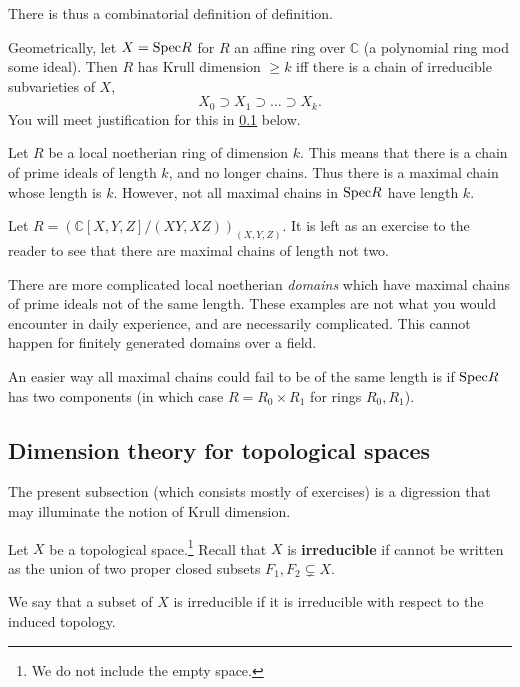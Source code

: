 There is thus a combinatorial definition of definition.

Geometrically, let $X = \mathrm{Spec} R$ for $R$ an affine ring over $\mathbb{C}$ (a
polynomial ring mod some ideal). Then $R$ has Krull dimension $\geq k$ iff there is a
chain of irreducible subvarieties of $X$,
\[ X_0 \supset X_1 \supset \dots \supset X_k . \]
You will meet justification for this in \ref{subsectiondimension} below.

\begin{remark} Let $R$ be a local noetherian ring of dimension $k$. This
means that there is a chain of prime ideals of length $k$, and no longer
chains. Thus there is a maximal chain whose length is $k$. However, not all
maximal chains in $\mathrm{Spec} R$ have length $k$. 
\end{remark} 

\begin{example} 
Let $R =( \mathbb{C}[X,Y,Z]/(XY,XZ))_{(X,Y,Z)}$. It is left as an
exercise to the reader to see that there are maximal chains of
length not two.

There are more complicated local noetherian \emph{domains} which have maximal
chains of prime ideals not of the same length. These examples are not what you
would encounter in daily experience, and are necessarily complicated. This
cannot happen for finitely generated domains over a field.
\end{example} 

\begin{example} 
An easier way all maximal chains could fail to be of the same length is if
$\mathrm{Spec} R$ has two components (in which case $R = R_0 \times R_1$ for rings
$R_0, R_1$). 
\end{example} 

\subsection{Dimension theory for topological spaces}
\label{subsectiondimension}
The present subsection (which consists mostly of exercises) is a digression   that may illuminate the notion of
Krull dimension.

\begin{definition} 
Let $X$ be a topological space.\footnote{We do not include the empty space.} Recall that $ X$ is
\textbf{irreducible} if  cannot be written as the union of
two proper closed subsets $F_1, F_2 \subsetneq X$.

We say that a subset of $X$ is irreducible if it is irreducible with respect
to the induced topology.
\end{definition} 

